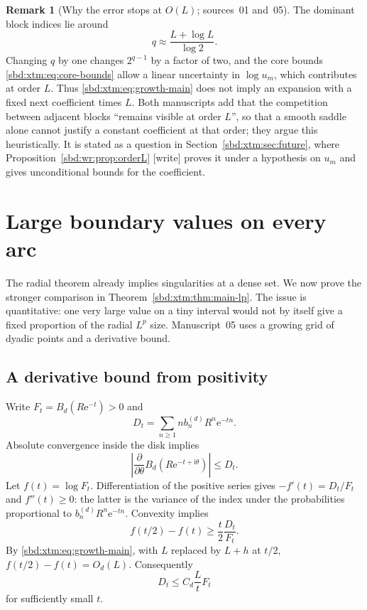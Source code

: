 \documentclass[11pt,a4paper]{article}
\theoremstyle{definition}
\newtheorem{remark}[theorem]{Remark}
\newcommand{\e}{\mathrm e}
\newcommand{\ii}{\mathrm i}
\begin{document}
\begin{remark}[Why the error stops at $O(L)$; sources~01 and~05]\label{sbd:edge:rem:orderL}
The dominant block indices lie around
\begin{equation}\label{sbd:edge:eq:dominant-index}
 q\approx\frac{L+\log L}{\log2}.
\end{equation}
Changing $q$ by one changes $2^{q-1}$ by a factor of two, and the core
bounds \eqref{sbd:xtm:eq:core-bounds} allow a linear uncertainty in
$\log u_m$, which contributes at order $L$. Thus
\eqref{sbd:xtm:eq:growth-main} does not imply an expansion with a fixed next
coefficient times $L$. Both manuscripts add that the competition between
adjacent blocks ``remains visible at order $L$'', so that a smooth saddle
alone cannot justify a constant coefficient at that order; they argue this
heuristically. It is stated as a question in
Section~\ref{sbd:xtm:sec:future}, where
Proposition~\ref{sbd:wr:prop:orderL} [write] proves it under a hypothesis on
$u_m$ and gives unconditional bounds for the coefficient.
\end{remark}

\section{Large boundary values on every arc}
\label{sbd:xtm:sec:lp}

The radial theorem already implies singularities at a dense set. We now
prove the stronger comparison in Theorem~\ref{sbd:xtm:thm:main-lp}. The
issue is quantitative: one very large value on a tiny interval would not by
itself give a fixed proportion of the radial $L^p$ size. Manuscript~05 uses
a growing grid of dyadic points and a derivative bound.

\subsection{A derivative bound from positivity}
Write $F_t=B_d(R\e^{-t})>0$ and
\begin{equation}\label{sbd:xtm:eq:angular-derivative}
 D_t=\sum_{n\ge1}n b_n^{(d)}R^n\e^{-tn}.
\end{equation}
Absolute convergence inside the disk implies
\[
 \left|\frac\partial{\partial\theta}
 B_d(R\e^{-t+\ii\theta})\right|\le D_t.
\]
Let $f(t)=\log F_t$. Differentiation of the positive series gives
$-f'(t)=D_t/F_t$ and $f''(t)\ge0$: the latter is the variance of the index
under the probabilities proportional to $b_n^{(d)}R^n\e^{-tn}$. Convexity
implies
\[
 f(t/2)-f(t)\ge\frac t2\frac{D_t}{F_t}.
\]
By \eqref{sbd:xtm:eq:growth-main}, with $L$ replaced by $L+h$ at $t/2$,
$f(t/2)-f(t)=O_d(L)$. Consequently
\begin{equation}\label{sbd:xtm:eq:derivative-bound}
 D_t\le C_d\frac Lt F_t
\end{equation}
for sufficiently small $t$.
\end{document}
